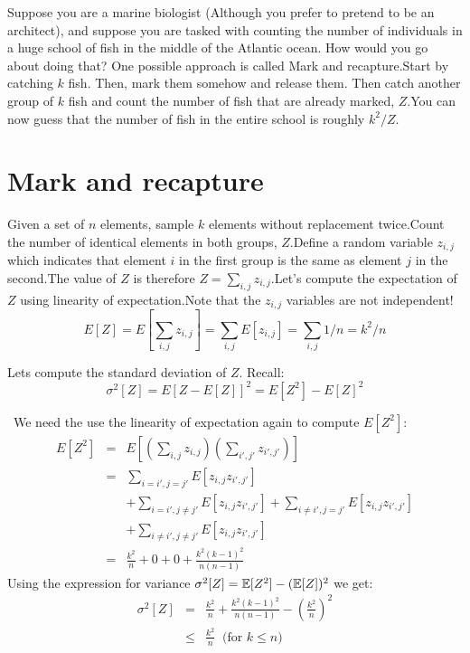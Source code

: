 \documentclass{article}
\begin{document}

Suppose you are a marine biologist (Although you prefer to pretend to be an architect), and suppose you are tasked with counting the number of individuals in a huge school of fish in the middle of the Atlantic ocean. How would you go about doing that? One possible approach is called Mark and recapture.Start by catching $k$ fish. Then, mark them somehow and release them. Then catch another group of $k$ fish and count the number of fish that are already marked, $Z$.You can now guess that the number of fish in the entire school is roughly $k^2/Z$.

\section*{Mark and recapture}Given a set of $n$ elements, sample $k$ elements without replacement twice.Count the number of identical elements in both groups, $Z$.Define a random variable $z_{i,j}$ which indicates that element $i$ in the first group is the same as element $j$ in the second.The value of $Z$ is therefore $Z = \sum_{i,j} z_{i,j}$.Let's compute the expectation of $Z$ using linearity of expectation.Note that the $z_{i,j}$ variables are not independent!\begin{equation}E[Z] = E[\sum_{i,j} z_{i,j}] = \sum_{i,j} E [z_{i,j}] = \sum_{i,j} 1/n = k^2/n\end{equation}

\noindent Lets compute the standard deviation of $Z$. Recall:$$\sigma^2[Z]  = E[Z-E[Z]]^2= E[Z^2] - E[Z]^2$$

\noindent  We need the use the linearity of expectation again to compute $E[Z^2]$:\begin{eqnarray}E[Z^2] &=& E[(\sum_{i,j} z_{i,j})(\sum_{i',j'} z_{i',j'})] \\ &=& \sum_{i=i',j=j'} E[z_{i,j}z_{i',j'}] \\& & + \sum_{i=i', j \ne j'} E[z_{i,j}z_{i',j'}] +\sum_{i \ne i', j = j'} E[z_{i,j}z_{i',j'}]  \\& & + \sum_{i \ne i', j \ne j'} E[z_{i,j}z_{i',j'}] \\& = & \frac{k^2}{n} + 0 + 0 + \frac{k^2(k-1)^2}{n(n-1)} \end{eqnarray}Using the expression for variance $\sigma^2[Z] = {\mathbb E}[Z^2] - ({\mathbb E}[Z])^2$ we get:\begin{eqnarray}\sigma^2[Z] &=& \frac{k^2}{n} + \frac{k^2(k-1)^2}{n(n-1)} - \left(\frac{k^2}{n}\right)^2 \\&\le& \frac{k^2}{n}   \;\;\mbox{(for $k \le n$)}\end{eqnarray}
\end{document}
